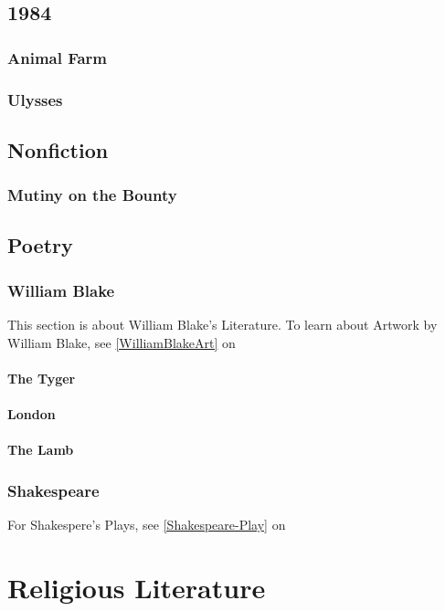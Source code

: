 			\subsection{1984}
			\subsubsection{Animal Farm}
			\subsubsection{Ulysses}
			
		\subsection{Nonfiction}
			\subsubsection{Mutiny on the Bounty}




\newpage
		\subsection{Poetry}
		
		\subsubsection{William Blake}
		\label{WilliamBlakeLit} This section is about William Blake's Literature.  To learn about Artwork by William Blake, see \ref{WilliamBlakeArt} on 
			\paragraph{The Tyger}
			\paragraph{London}
			\paragraph{The Lamb}
		\subsubsection{Shakespeare} \label{Shakespeare-Poetry} For Shakespere's Plays, see \ref{Shakespeare-Play} on 
		
	\newpage
	\section{Religious Literature}

